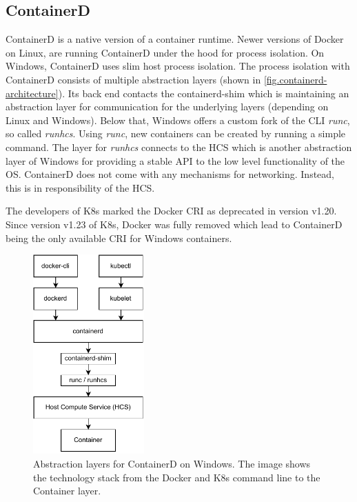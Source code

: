 \subsection{ContainerD}
ContainerD is a native version of a container runtime. Newer versions of Docker on Linux, are running ContainerD under the hood for process isolation. On \ac{Windows}, ContainerD uses slim host process isolation.  The process isolation with ContainerD consists of multiple abstraction layers (shown in \autoref{fig.containerd-architecture}). Its back end contacts the containerd-shim which is maintaining an abstraction layer for communication for the underlying layers (depending on Linux and \ac{Windows}). Below that, \ac{Windows} offers a custom fork of the \ac{CLI} \textit{runc}, so called \textit{runhcs}\cite{Scooley.2022}. Using \textit{runc}, new containers can be created by running a simple command\cite{Scooley.2022}. The layer for \textit{runhcs} connects to the \ac{HCS} which is another abstraction layer of \ac{Windows} for providing a stable \ac{API} to the low level functionality of the \ac{OS}\cite{Microsoft.2017}. ContainerD does not come with any mechanisms for networking. Instead, this is in responsibility of the \ac{HCS}.

The developers of \ac{K8s} marked the Docker \ac{CRI} as deprecated in version v1.20\cite{Kubernetes.2020}. Since version v1.23 of \ac{K8s}, Docker was fully removed which lead to ContainerD being the only available \ac{CRI} for \ac{Windows} containers.

\begin{figure}[h]
	\centering
	\includegraphics[width=0.38\textwidth]{Figures/containerd-architecture.pdf}
	\caption{Abstraction layers for ContainerD on Windows. The image shows the technology stack from the Docker and \ac{K8s} command line to the Container layer.\cite{Scooley.2022}}
	\label{fig.containerd-architecture}
\end{figure}


